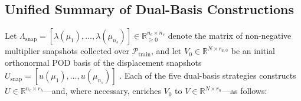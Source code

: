 \documentclass[11pt,a4paper]{article}
\begin{document}
\hypertarget{unified-summary-of-dual-basis-constructions}{%
\subsection{Unified Summary of Dual-Basis Constructions}\label{unified-summary-of-dual-basis-constructions}}

Let \(\Lambda_{\text{snap}} = [\lambda(\mu_1), \dots, \lambda(\mu_{n_s})] \in \mathbb{R}_{\ge 0}^{n_c \times n_s}\) denote the matrix of non-negative multiplier snapshots collected over \(\mathcal{P}_{\text{train}}\), and let \(V_0 \in \mathbb{R}^{N \times r_{u,0}}\) be an initial orthonormal POD basis of the displacement snapshots \(U_{\text{snap}} = [u(\mu_1), \dots, u(\mu_{n_s})]\) \cite{balajewicz2016projection, benaceur2020reduced}. Each of the five dual-basis strategies constructs \(U \in \mathbb{R}^{n_c \times r_\lambda}\)---and, where necessary, enriches \(V_0\) to \(V \in \mathbb{R}^{N \times r_u}\)---as follows:
\end{document}
